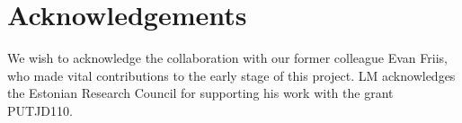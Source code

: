 \section*{Acknowledgements}

We wish to acknowledge the collaboration with our former colleague Evan Friis,
who made vital contributions to the early stage of this project. LM acknowledges the Estonian Research Council for supporting his work with the grant PUTJD110. 